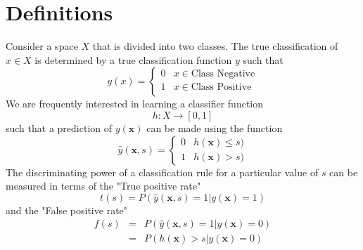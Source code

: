 



\section{Definitions}

Consider a space $X$ that is divided into two classes. The true classification of $x \in X$ is determined by a true classification function $y$ such that
\begin{equation*}
    y(x) = \left\{
    \begin{array}{ll}
    0 & x \in \textrm{Class Negative} \\
    1 & x \in \textrm{Class Positive} \\
    \end{array}
    \right.
\end{equation*}
We are frequently interested in learning a classifier function
\begin{equation*}
    h : X \to [0,1]
\end{equation*}
such that a prediction of $y(\mathbf{x})$ can be made using the function
\begin{equation*}
    \hat{y}(\mathbf{x}, s) = \left\{
        \begin{array}{ll}
            0 & h(\mathbf{x}) \leq s) \\
            1 & h(\mathbf{x}) > s)
        \end{array}
    \right.
\end{equation*}
The discriminating power of a classification rule for a particular value of $s$ can be measured in terms of the "True positive rate"
\begin{equation}
    t(s) = P\left(\hat{y}(\mathbf{x},s) = 1 | y(\mathbf{x})=1 \right) \label{def:tpr}
\end{equation}
and the "False positive rate"
\begin{equation}
    \begin{array}{lcl}
    f(s) & = & P\left(\hat{y}(\mathbf{x},s) = 1 | y(\mathbf{x})=0 \right)\label{def:fpr} \\ 
         & = & P\left( h(\mathbf{x}) > s | y(\mathbf{x})=0\right) \\
    \end{array}
\end{equation}

